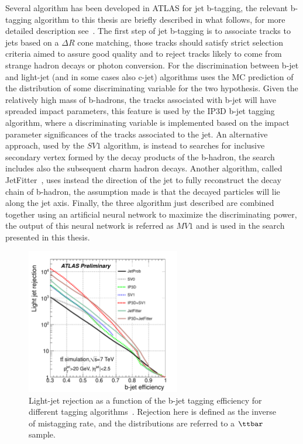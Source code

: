 Several algorithm has been developed in ATLAS for jet b-tagging, the relevant b-tagging algorithm
to this thesis are briefly described in what follows, for more detailed description see~\cite{AtlasCSCBook}.
The first step of jet b-tagging is to associate tracks to jets based on a $\Delta R$ cone matching, those tracks 
should satisfy strict selection criteria aimed to assure good quality 
and to reject tracks likely to come from strange hadron decays or photon conversion. 
For the discrimination between b-jet and light-jet (and in some cases also c-jet) 
algorithms uses the MC prediction of the distribution of some discriminating variable 
for the two hypothesis.
Given the relatively high mass of b-hadrons, the tracks
associated with b-jet will have spreaded impact parameters, this feature is used by the IP3D b-jet tagging 
algorithm, where a discriminating variable is implemented based on the impact parameter significances of the tracks
associated to the jet. An alternative approach, used by the $SV1$ algorithm, is instead  to searches for inclusive 
secondary vertex formed by the decay products of the b-hadron,  the search includes also 
the subsequent charm hadron decays. Another algorithm, called JetFitter~\cite{jetfitter}, uses instead the direction of the jet
to fully reconstruct the decay chain of b-hadron, the assumption made is that the decayed particles will lie along the
jet axis. Finally, the three algorithm just described are combined together using an
artificial neural network to maximize the discriminating power, the output of this neural network is referred
as $MV1$ and is used in the search presented in this thesis. 

\begin{figure}[tp]
     \begin{center}

            \includegraphics[width=0.6\textwidth]{figure/obj/btag_perf.pdf}

    \end{center}
    \caption{Light-jet rejection as a function of the b-jet tagging efficiency for different tagging algorithms~\cite{btagPerf}.
	    Rejection here is defined as the inverse of mistagging rate, and the distributions are referred to a 
		$\ttbar$ sample.}
   \label{fig:beff}
\end{figure}

